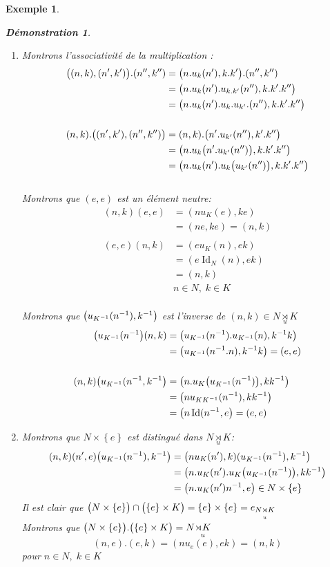\documentclass[a4paper, oneside]{report}
\theoremstyle{break}
\newtheorem{exemple}[thm]{Exemple}
\newtheorem*{demonstration}{Démonstration}
\DeclarePairedDelimiter\ens{\left\{ }{\right\} }%
\DeclarePairedDelimiter\pa{\big(}{\big)}%
\DeclareMathOperator{\Id}{Id}
\renewcommand{\ens}[1]{\left\{ #1 \right\} }%
\newcommand{\us}{\underset}
\newcommand{\Pa}{\pa}
\newcommand{\para}{\pa}
\begin{document}
\begin{exemple}
\begin{demonstration}
\begin{enumerate}
\item  Montrons l'associativité de la multiplication :
\begin{align*}
\pa{(n, k), (n', k')} . (n'', k'') &= \pa{n . u_k (n'), k.k'}.(n'', k'')
\\
&= \pa{n . u_k(n') . u_{k.k'}(n''), k.k'.k''}
\\
&= \pa{n . u_k(n') . u_k . u_{k'} . (n''), k.k'.k''}
\\
\\
(n, k) . \pa{(n', k'), (n'', k'')} &= (n, k) . \pa{n' . u_{k'}(n''), k'.k''}
\\
&= \Pa{n . u_k\pa{n'.u_{k'}(n'')}, k.k'.k''}
\\
&= \Pa{n . u_k(n').u_k\pa{u_{k'}(n'')}, k.k'.k''}
\end{align*}\\
Montrons que $(e,e)$ est un élément neutre:
\begin{align*}
(n,k)(e,e) &= (n u_K(e), ke)
\\
&= (ne, ke) = (n,k)
\\
\\
(e,e)(n,k) &= (e u_K(n), ek) 
\\
&= (e \Id_N(n), ek) 
\\
&= (n,k)
\\
&n \in N, \; k \in K
\end{align*}\\
Montrons que $\pa{u_{K^{-1}}(n^{-1}), k^{-1}}$ est l'inverse de $(n,k) \in N \us{u}{\rtimes} K$
\begin{align*}
\pa{u_{K^{-1}}(n^{-1}}(n, k) &= \pa{u_{K^{-1}}(n^{-1}) . u_{K^{-1}}(n), k^{-1}k} 
\\
&= \pa{u_{K^{-1}}(n^{-1}.n), k^{-1}k} = (e, e)
\\
\\
(n,k)\pa{u_{K^{-1}}(n^{-1}, k^{-1}} &= \Pa{n . u_K \pa{u_{K^{-1}}(n^{-1})}, kk^{-1}} 
\\
&= \pa{n u_{KK^{-1}}(n^{-1}), kk^{-1}} 
\\
&= \pa{n \Id(n^{-1}, e} = (e, e)
\end{align*}

\bigbreak

\item  Montrons que $N \times \ens{e}$ est distingué dans $N \us{u}{\rtimes} K$:
\begin{align*}
(n, k)(n', e)\pa{u_{K^{-1}}(n^{-1}), k ^{-1}} &= \pa{n u_K(n'), k)(u_{K^{-1}}(n^{-1}), k^{-1}}
\\
&= \Pa{n . u_K(n') . u_K\pa{u_{K^{-1}}(n^{-1})}, kk^{-1}}
\\
&= \pa{n . u_K(n')n^{-1}, e} \in N \times \ens{e}
\end{align*}
Il est clair que $\para{N \times \ens{e}} \cap \para{\ens{e} \times K} = \ens{e} \times \ens{e} = e_{N \us{u}{\rtimes} K}$\\
Montrons que $\para{N \times \ens{e}} . \para{\ens{e} \times K} = N \us{u}{\rtimes K}$
\[
(n, e).(e, k) = (n u_e(e), ek) = (n,k)
\]
pour $n \in N, \; k \in K$
\end{enumerate}
\end{demonstration}


\end{exemple}
\end{document}
